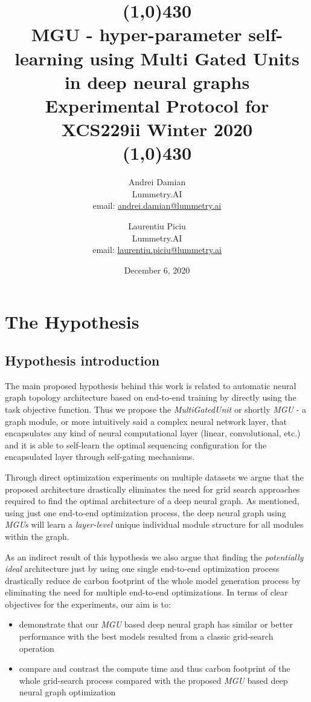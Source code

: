 \documentclass[11pt]{article}
\title{%
 \line(1,0){430}\\
 MGU - hyper-parameter self-learning using Multi Gated Units in deep neural graphs \\
  \large Experimental Protocol for XCS229ii Winter 2020 \\
  \line(1,0){430}  
  }
\date{December 6, 2020}
\author{
Andrei Damian \\ Lummetry.AI \\ email: \href{mailto:andrei.damian@lummetry.ai}{andrei.damian@lummetry.ai}
\and
Laurentiu Piciu \\ Lummetry.AI \\ email: \href{mailto:laurentiu.piciu@lummetry.ai}{laurentiu.piciu@lummetry.ai}
}
\providecommand{\tightlist}{%
      \setlength{\itemsep}{0pt}\setlength{\parskip}{0pt}}
\begin{document}
    
    \maketitle
    
    

    
    \hypertarget{the-hypothesis}{%
\section{The Hypothesis}\label{the-hypothesis}}

\hypertarget{hypothesis-introduction}{%
\subsection{Hypothesis introduction}\label{hypothesis-introduction}}

The main proposed hypothesis behind this work is related to automatic
neural graph topology architecture based on end-to-end training by
directly using the task objective function. Thus we propose the
\emph{MultiGatedUnit} or shortly \emph{MGU} - a graph module, or more
intuitively said a complex neural network layer, that encapsulates any
kind of neural computational layer (linear, convolutional, etc.) and it
is able to self-learn the optimal sequencing configuration for the
encapsulated layer through self-gating mechanisms.

Through direct optimization experiments on multiple datasets we argue
that the proposed architecture drastically eliminates the need for grid
search approaches required to find the optimal architecture of a deep
neural graph. As mentioned, using just one end-to-end optimization
process, the deep neural graph using \emph{MGUs} will learn a
\emph{layer-level} unique individual module structure for all modules
within the graph.

As an indirect result of this hypothesis we also argue that finding the
\emph{potentially ideal} architecture just by using one single
end-to-end optimization process drastically reduce de carbon footprint
of the whole model generation process by eliminating the need for
multiple end-to-end optimizations. In terms of clear objectives for the
experiments, our aim is to:

\begin{itemize}
\tightlist
\item
  demonstrate that our \emph{MGU} based deep neural graph has similar or
  better performance with the best models resulted from a classic
  grid-search operation
\item
  compare and contrast the compute time and thus carbon footprint of the
  whole grid-search process compared with the proposed \emph{MGU} based
  deep neural graph optimization
\end{itemize}
\end{document}
